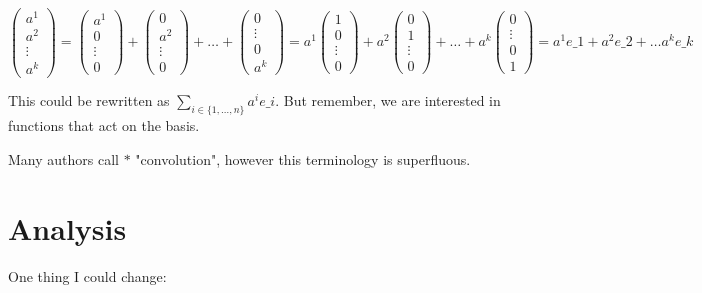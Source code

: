 \documentclass[12pt,a4paper]{article}
\begin{document}
$\begin{pmatrix} a^1 \\ a^2 \\ \ensuremath{\vdots} \\ a^k \end{pmatrix} = \begin{pmatrix} a^1 \\ 0 \\ \ensuremath{\vdots} \\ 0 \end{pmatrix} + \begin{pmatrix} 0 \\ a^2 \\ \ensuremath{\vdots} \\ 0 \end{pmatrix} + \ensuremath{\ldots} + \begin{pmatrix} 0 \\  \ensuremath{\vdots} \\ 0\\ a^k \end{pmatrix}  = a^1\begin{pmatrix} 1 \\ 0 \\ \ensuremath{\vdots} \\ 0 \end{pmatrix} + a^2\begin{pmatrix} 0 \\ 1 \\ \ensuremath{\vdots} \\ 0 \end{pmatrix} + \ensuremath{\ldots} + a^k\begin{pmatrix} 0 \\  \ensuremath{\vdots} \\ 0\\ 1\end{pmatrix}  = a^1 e\ensuremath{\_1} + a^2 e\ensuremath{\_2} + \ensuremath{\ldots} a^k e\ensuremath{\_k}$

This could be rewritten as $\ensuremath{\sum}_{i \ensuremath{\in} \{1,\ensuremath{\ldots},n\} } a^i e\ensuremath{\_i}$. But remember, we are interested in functions that act on the basis.

Many authors call $*$ "convolution", however this terminology is superfluous.

\section{Analysis}
One thing I could change:
\end{document}
